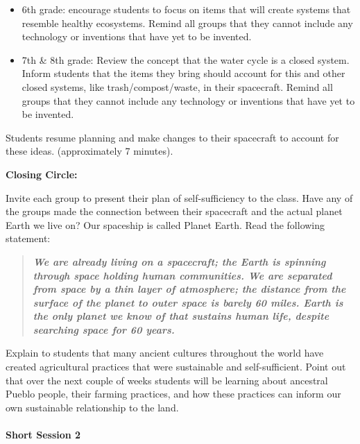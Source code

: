 \documentclass[12pt,]{article}
\providecommand{\tightlist}{%
  \setlength{\itemsep}{0pt}\setlength{\parskip}{0pt}}
\let\oldparagraph\paragraph
\renewcommand{\paragraph}[1]{\oldparagraph{#1}\mbox{}}
\begin{document}
\begin{enumerate}
  \begin{itemize}
  \tightlist
  \item
    6th grade: encourage students to focus on items that will create
    systems that resemble healthy ecosystems. Remind all groups
    that they cannot include any technology or inventions that
    have yet to be invented.
  \item
    7th \& 8th grade: Review the concept that the water cycle is a
    closed system. Inform students that the items they bring
    should account for this and other closed systems, like
    trash/compost/waste, in their spacecraft. Remind all groups
    that they cannot include any technology or inventions that
    have yet to be invented.
  \end{itemize}
\end{enumerate}

Students resume planning and make changes to their spacecraft to account
for these ideas. (approximately 7 minutes).

\textbf{Closing Circle:}

Invite each group to present their plan of self-sufficiency to the
class. Have any of the groups made the connection between their
spacecraft and the actual planet Earth we live on? Our spaceship is
called Planet Earth. Read the following statement:

\begin{quote}
\textbf{\emph{We are already living on a spacecraft; the Earth is spinning through
space holding human communities. We are separated from space by a thin
layer of atmosphere; the distance from the surface of the planet to
outer space is barely 60 miles. Earth is the only planet we know of that
sustains human life, despite searching space for 60 years.}}
\end{quote}

Explain to students that many ancient cultures throughout the world have
created agricultural practices that were sustainable and
self-sufficient. Point out that over the next couple of weeks students
will be learning about ancestral Pueblo people, their farming practices,
and how these practices can inform our own sustainable relationship to
the land.

\hypertarget{short-session-2}{%
\paragraph{Short Session 2}\label{short-session-2}}
\end{document}
